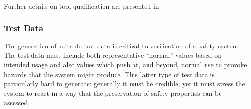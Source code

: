 

Further details on tool qualification are presented in .

\subsubsection{Test Data}
The generation of suitable test data is critical to verification of a safety system. The test data must include both representative ``normal'' values based on intended usage and also values which push at, and beyond, normal use to provoke \glspl{hazard} that the system might produce. This latter type of test data is particularly hard to generate: generally it must be credible, yet it must stress the system to react in a way that the preservation of safety properties can be assessed. 

